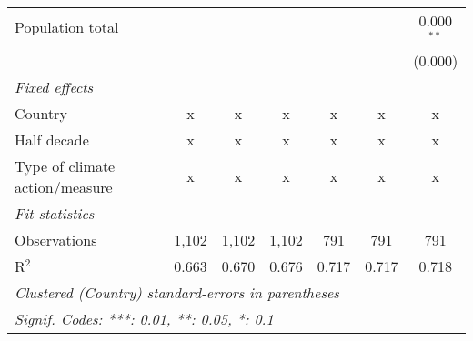 \begin{tabular}{lcccccc}
   Population total                                              &         &                &                &                &                & 0.000$^{**}$\\   
                                                                 &         &                &                &                &                & (0.000)\\   
   \emph{Fixed effects}\\
   Country                                                       & x       & x              & x              & x              & x              & x\\  
   Half decade                                                   & x       & x              & x              & x              & x              & x\\  
   Type of climate action/measure                                & x       & x              & x              & x              & x              & x\\  
   \midrule \emph{Fit statistics}\\
   Observations                                                  & 1,102   & 1,102          & 1,102          & 791            & 791            & 791\\  
   R$^2$                                                         & 0.663   & 0.670          & 0.676          & 0.717          & 0.717          & 0.718\\  
   \midrule
   \multicolumn{7}{l}{\emph{Clustered (Country) standard-errors in parentheses}}\\
   \multicolumn{7}{l}{\emph{Signif. Codes: ***: 0.01, **: 0.05, *: 0.1}}\\
\end{tabular}
\par\endgroup


